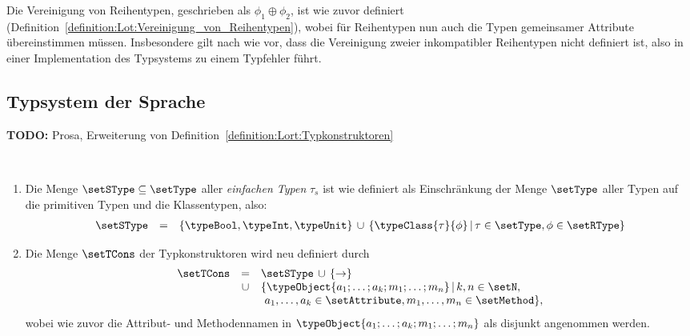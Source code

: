 Die Vereinigung von Reihentypen, geschrieben als $\phi_1\oplus\phi_2$, ist wie zuvor definiert
(Definition~\ref{definition:Lot:Vereinigung_von_Reihentypen}), wobei f\"ur Reihentypen nun auch
die Typen gemeinsamer Attribute \"ubereinstimmen m\"ussen. Insbesondere gilt nach wie vor, dass
die Vereinigung zweier inkompatibler Reihentypen nicht definiert ist, also in einer Implementation
des Typsystems zu einem Typfehler f\"uhrt.



\subsection{Typsystem der Sprache \Lct}

{\bf TODO:} Prosa, Erweiterung von Definition~\ref{definition:Lort:Typkonstruktoren}

\begin{definition} \
  \begin{enumerate}
    \item Die Menge $\setSType \subseteq \setType$ aller {\em einfachen Typen} $\tau_s$ ist wie definiert
          als Einschr\"ankung der Menge $\setType$ aller Typen auf die primitiven Typen und die
          Klassentypen, also:
          \[\begin{array}{rcl}
            \setSType
            & = &
            \{\typeBool,\typeInt,\typeUnit\}
            \,\cup\,
            \{\typeClass{\tau}{\phi}\,|\,\tau\in\setType,\phi\in\setRType\}
          \end{array}\]

    \item Die Menge $\setTCons$ der Typkonstruktoren wird neu definiert durch
          \[\begin{array}{rcl}
            \setTCons &   =  & \setSType\,\cup\,\{\to\} \\
                      & \cup & \{\typeObject{a_1;\ldots;a_k;m_1;\ldots;m_n}\,|\,k,n\in\setN, \\
                      &      & \ a_1,\ldots,a_k\in\setAttribute, m_1,\ldots,m_n\in\setMethod\},
          \end{array}\]
          wobei wie zuvor die Attribut- und Methodennamen in $\typeObject{a_1;\ldots;a_k;m_1;\ldots;m_n}$ als disjunkt
          angenommen werden.
  \end{enumerate}
\end{definition}

